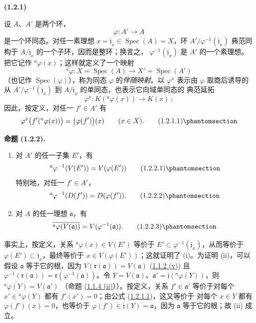 \documentclass[UTF8,fontset=none,11pt,oneside,openany]{ctexbook}
\newenvironment{env}[1][]{%
  \par\medskip\noindent\textbf{(#1)}\ %
}{\par}
\newenvironment{proposition}[1][]{%
  \par\medskip\noindent\textbf{命题 (#1).}\ %
}{\par}
\let\EGAOriginalLabel\label
\renewcommand{\label}[1]{\phantomsection\EGAOriginalLabel{#1}}
\begin{document}
\begin{env}[1.2.1]
\label{I.1.2.1-fr}
设 $A$、$A'$ 是两个环，
\[
  \varphi:A'\longrightarrow A
\]
是一个环同态。对任一素理想
$x=\mathfrak{j}_x\in\operatorname{Spec}(A)=X$，环
$A'/\varphi^{-1}(\mathfrak{j}_x)$ 典范同构于
$A/\mathfrak{j}_x$ 的一个子环，因而是整环；换言之，
$\varphi^{-1}(\mathfrak{j}_x)$ 是 $A'$ 的一个素理想。把它记作
${}^a\varphi(x)$；这样就定义了一个映射
\[
  {}^a\varphi:X=\operatorname{Spec}(A)\longrightarrow
  X'=\operatorname{Spec}(A')
\]
（也记作 $\operatorname{Spec}(\varphi)$），称为同态
$\varphi$ 的\emph{伴随映射}。以 $\varphi^x$ 表示由 $\varphi$
取商后诱导的从 $A'/\varphi^{-1}(\mathfrak{j}_x)$ 到
$A/\mathfrak{j}_x$ 的单同态，也表示它向域单同态的
典范延拓
\[
  \varphi^x:K({}^a\varphi(x))\longrightarrow K(x)~;
\]
因此，按定义，对任一 $f'\in A'$ 有
\begin{equation}
  \varphi^x\bigl(f'({}^a\varphi(x))\bigr)=\bigl(\varphi(f')\bigr)(x)
  \qquad(x\in X).
  \tag{1.2.1.1}\label{I.1.2.1.1-fr}
\end{equation}
\end{env}

\begin{proposition}[1.2.2]
\label{I.1.2.2-fr}
\begin{enumerate}
  \item[\rm(i)] 对 $A'$ 的任一子集 $E'$，有
  \begin{equation}
    {}^a\varphi^{-1}(V(E'))=V(\varphi(E'))
    \tag{1.2.2.1}\label{I.1.2.2.1-fr}
  \end{equation}
  特别地，对任一 $f'\in A'$，
  \begin{equation}
    {}^a\varphi^{-1}(D(f'))=D(\varphi(f')).
    \tag{1.2.2.2}\label{I.1.2.2.2-fr}
  \end{equation}
  \item[\rm(ii)] 对 $A$ 的任一理想 $\mathfrak{a}$，有
  \begin{equation}
    \overline{{}^a\varphi(V(\mathfrak{a}))}
    =V(\varphi^{-1}(\mathfrak{a})).
    \tag{1.2.2.3}\label{I.1.2.2.3-fr}
  \end{equation}
\end{enumerate}
\end{proposition}

事实上，按定义，关系 ${}^a\varphi(x)\in V(E')$ 等价于
$E'\subset\varphi^{-1}(\mathfrak{j}_x)$，从而等价于
$\varphi(E')\subset\mathfrak{j}_x$，最终等价于
$x\in V(\varphi(E'))$；这就证明了 (i)。为证明 (ii)，可以假设
$\mathfrak{a}$ 等于它的根，因为
$V(\mathfrak{r}(\mathfrak{a}))=V(\mathfrak{a})$
(\hyperref[I.1.1.2-fr]{1.1.2 (v)}) 且
$\varphi^{-1}(\mathfrak{r}(\mathfrak{a}))
=\mathfrak{r}(\varphi^{-1}(\mathfrak{a}))$。令
$Y=V(\mathfrak{a})$、$\mathfrak{a}'=\mathfrak{j}({}^a\varphi(Y))$，则
$\overline{{}^a\varphi(Y)}=V(\mathfrak{a}')$
（命题 (\hyperref[I.1.1.4-fr]{1.1.4 (ii)}））。按定义，关系
$f'\in\mathfrak{a}'$ 等价于对每个 $x'\in{}^a\varphi(Y)$ 都有
$f'(x')=0$；由公式 (\hyperref[I.1.2.1.1-fr]{1.2.1.1})，这又等价于
对每个 $x\in Y$ 都有 $\varphi(f')(x)=0$，也等价于
$\varphi(f')\in\mathfrak{j}(Y)=\mathfrak{a}$，因为
$\mathfrak{a}$ 等于它的根；故 (ii) 成立。
\end{document}
